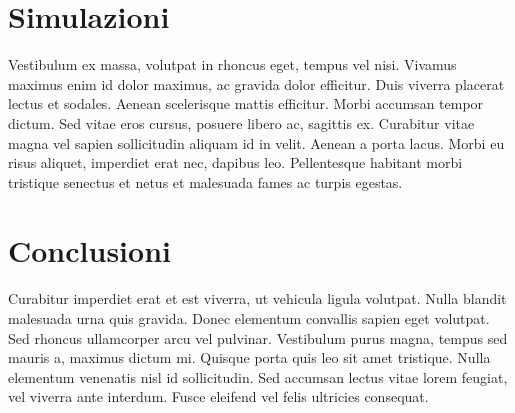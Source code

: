 \documentclass[a4paper,twocolumn]{article}
\begin{document}
\section{Simulazioni}
Vestibulum ex massa, volutpat in rhoncus eget, tempus vel nisi. Vivamus maximus enim id dolor maximus, ac gravida dolor efficitur. Duis viverra placerat lectus et sodales. Aenean scelerisque mattis efficitur. Morbi accumsan tempor dictum. Sed vitae eros cursus, posuere libero ac, sagittis ex. Curabitur vitae magna vel sapien sollicitudin aliquam id in velit. Aenean a porta lacus. Morbi eu risus aliquet, imperdiet erat nec, dapibus leo. Pellentesque habitant morbi tristique senectus et netus et malesuada fames ac turpis egestas.
\section{Conclusioni}
Curabitur imperdiet erat et est viverra, ut vehicula ligula volutpat. Nulla blandit malesuada urna quis gravida. Donec elementum convallis sapien eget volutpat. Sed rhoncus ullamcorper arcu vel pulvinar. Vestibulum purus magna, tempus sed mauris a, maximus dictum mi. Quisque porta quis leo sit amet tristique. Nulla elementum venenatis nisl id sollicitudin. Sed accumsan lectus vitae lorem feugiat, vel viverra ante interdum. Fusce eleifend vel felis ultricies consequat. 
\end{document}
